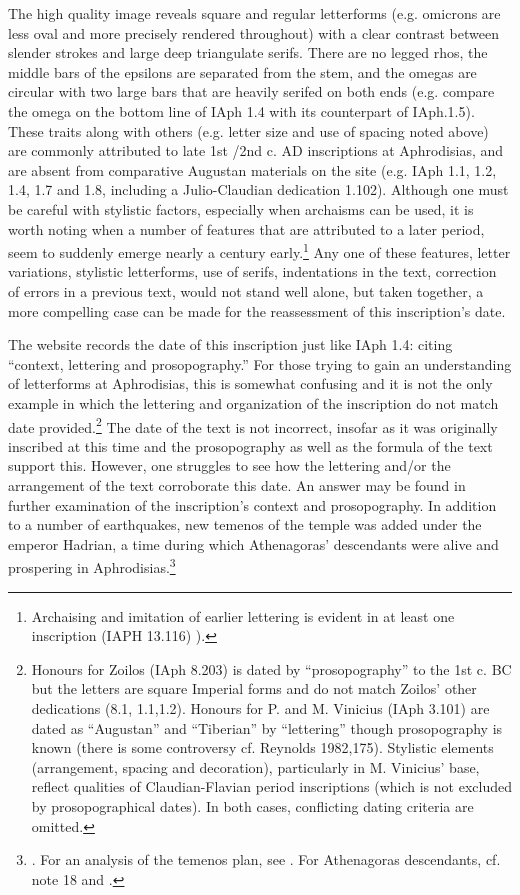 \documentclass[amsthm,ebook]{saparticle}
\begin{document}
The high quality image reveals square and regular letterforms (e.g. omicrons are less oval and more precisely rendered
throughout) with a clear contrast between slender strokes and large deep triangulate serifs. There are no legged rhos,
the middle bars of the epsilons are separated from the stem, and the omegas are circular with two large bars that are
heavily serifed on both ends (e.g. compare the omega on the bottom line of IAph 1.4 with its counterpart of IAph.1.5).
These traits along with others (e.g. letter size and use of spacing noted above) are commonly attributed to late 1st
/2nd c. AD inscriptions at Aphrodisias, and are absent from comparative Augustan materials on the site (e.g. IAph 1.1,
1.2, 1.4, 1.7 and 1.8, including a Julio-Claudian dedication 1.102). Although one must be careful with stylistic
factors, especially when archaisms can be used, it is worth noting when a number of features that are attributed to a
later period, seem to suddenly emerge nearly a century early.\footnote{ Archaising and imitation of earlier lettering
is evident in at least one inscription (IAPH 13.116) \citet[155-166]{reynolds1982}). } Any one of these features, letter
variations, stylistic letterforms, use of serifs, indentations in the text, correction of errors in a previous text,
would not stand well alone, but taken together, a more compelling case can be made for the reassessment of this
inscription’s date. 




The website records the date of this inscription just like IAph 1.4: citing ``context, lettering and prosopography.'' For
those trying to gain an understanding of letterforms at Aphrodisias, this is somewhat confusing and it is not the only
example in which the lettering and organization of the inscription do not match date provided.\footnote{ Honours for
Zoilos (IAph 8.203) is dated by ``prosopography'' to the 1st c. BC but the letters are square Imperial forms and do not
match Zoilos’ other dedications (8.1, 1.1,1.2). Honours for P. and M. Vinicius (IAph 3.101) are dated as ``Augustan'' and
``Tiberian'' by ``lettering'' though prosopography is known (there is some controversy cf. Reynolds 1982,175). Stylistic
elements (arrangement, spacing and decoration), particularly in M. Vinicius’ base, reflect qualities of
Claudian-Flavian period inscriptions (which is not excluded by prosopographical dates). In both cases, conflicting
dating criteria are omitted. } The date of the text is not incorrect, insofar as it was originally inscribed at
this time and the prosopography as well as the formula of the text support this. However, one struggles to see how
the lettering and/or the arrangement of the text corroborate this date. An answer may be found in further examination
of the inscription’s context and prosopography. In addition to a number of earthquakes, new temenos of the temple was
added under the emperor Hadrian, a time during which Athenagoras’ descendants were alive and prospering in
Aphrodisias.\footnote{\citep[43]{smith1995}. For an analysis of the temenos plan, see \citet[66-74]{doruk1990}. For Athenagoras descendants, cf. note 18 and \citet[327-334]{reynolds1999b}.} 
\end{document}
